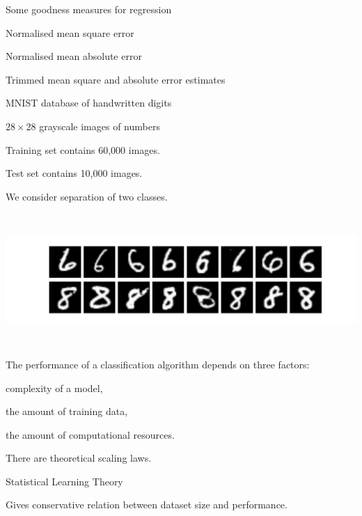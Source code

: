 \documentclass[landscape,footrule]{foils}
\begin{document}
Some goodness measures for regression
\begin{triangles}
\item Normalised mean square error
\item Normalised mean absolute error
\item Trimmed mean square and absolute error estimates  
\end{triangles}


MNIST database of handwritten digits
\begin{triangles}
\item  $28\times28$ grayscale images of numbers 
\item Training set contains 60,000 images.
\item Test set contains 10,000 images.
\item We consider separation of two classes.
\end{triangles}

\vspace{1cm}
\centerline{\includegraphics[height=5cm]{mnist_sample_plot}}



The performance of a classification algorithm depends on three factors:
\begin{triangles}
\item complexity of a model,
\item the amount of training data,
\item the amount of computational resources.
\end{triangles}

\vspace*{1cm}

There are theoretical scaling laws.
\begin{diamonds}
\item Statistical Learning Theory
\item Gives conservative relation between dataset size and performance.  
\end{diamonds}
\end{document}
